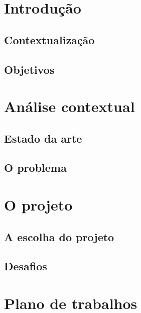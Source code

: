 \documentclass[
  oneside,
  11pt, a4paper,
  footinclude=true,
  headinclude=true,
  cleardoublepage=empty
]{scrbook}
\begin{document}
  \cleardoublepage
  \listoffigures
  
  \cleardoublepage
  \setcounter{page}{3}

\chapter{Introdução}
\section{Contextualização}
\section{Objetivos}

\chapter{Análise contextual}
\section{Estado da arte}
\section{O problema}

\chapter{O projeto}
\section{A escolha do projeto}
\section{Desafios}

\chapter{Plano de trabalhos}


\printindex
  
\end{document}
